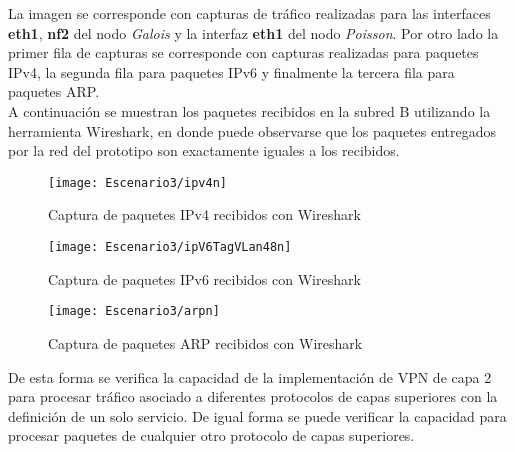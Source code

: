 La imagen se corresponde con capturas de tr\'afico realizadas para las interfaces \textbf{eth1}, \textbf{nf2} del nodo \textit{Galois} y la interfaz \textbf{eth1} del nodo \textit{Poisson}. Por otro lado la primer fila de capturas se corresponde con capturas realizadas para paquetes IPv4, la segunda fila para paquetes IPv6 y finalmente la tercera fila para paquetes ARP.\\

A continuaci\'on se muestran los paquetes recibidos en la subred B utilizando la herramienta Wireshark, en donde puede observarse que los paquetes entregados por la red del prototipo son exactamente iguales a los recibidos.

\newpage
\begin{figure}[h!] 
\centering    
\texttt{[image: Escenario3/ipv4n]}
\caption[Captura de paquetes IPv4 recibidos con Wireshark]{Captura de paquetes IPv4 recibidos con Wireshark}
\label{fig:CapturaTCP}
\end{figure}

\begin{figure}[h!] 
\centering    
\texttt{[image: Escenario3/ipV6TagVLan48n]}
\caption[Captura de paquetes IPv6 recibidos con Wireshark]{Captura de paquetes IPv6 recibidos con Wireshark}
\label{fig:CapturaTCP}
\end{figure}

\begin{figure}[h!] 
\centering    
\texttt{[image: Escenario3/arpn]}
\caption[Captura de paquetes ARP recibidos con Wireshark]{Captura de paquetes ARP recibidos con Wireshark}
\label{fig:CapturaTCP}
\end{figure}


De esta forma se verifica la capacidad de la implementaci\'on de VPN de capa 2 para procesar tr\'afico asociado a diferentes protocolos de capas superiores con la definici\'on de un solo servicio. De igual forma se puede verificar la capacidad para procesar paquetes de cualquier otro protocolo de capas superiores.\\ 